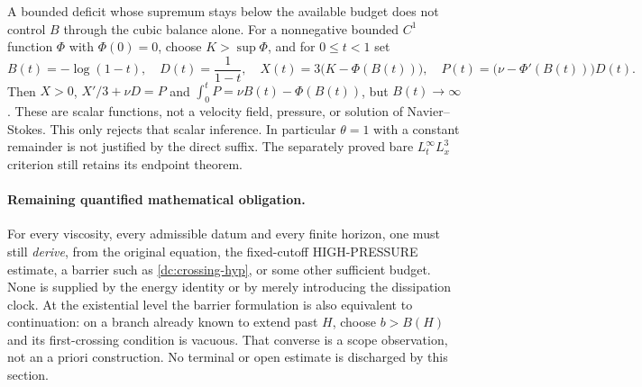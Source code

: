 \begin{remark}
\label{dc:scalar}
A bounded deficit whose supremum stays below the available budget does not
control $B$ through the cubic balance alone.  For a nonnegative bounded
$C^1$ function $\Phi$ with $\Phi(0)=0$, choose $K>\sup\Phi$, and for
$0\le t<1$ set
\[
 B(t)=-\log(1-t),\quad D(t)=\frac1{1-t},\quad
 X(t)=3\bigl(K-\Phi(B(t))\bigr),\quad
 P(t)=\bigl(\nu-\Phi'(B(t))\bigr)D(t).
\]
Then $X>0$, $X'/3+\nu D=P$ and
$\int_0^tP=\nu B(t)-\Phi(B(t))$, but $B(t)\to\infty$.
These are scalar functions, not a velocity field, pressure, or solution of
Navier--Stokes.  This only rejects that scalar inference.  In particular
$\theta=1$ with a constant remainder is not justified by the direct
suffix.  The separately proved bare $L^\infty_tL^3_x$ criterion still
retains its endpoint theorem.
\end{remark}

\paragraph{Remaining quantified mathematical obligation.}
For every viscosity, every admissible datum and every finite horizon, one
must still \emph{derive}, from the original equation, the fixed-cutoff
HIGH-PRESSURE estimate, a barrier such as \eqref{dc:crossing-hyp}, or some
other sufficient budget.  None is supplied by the energy identity or by
merely introducing the dissipation clock.  At the existential level the
barrier formulation is also equivalent to continuation: on a branch already
known to extend past $H$, choose $b>B(H)$ and its first-crossing condition
is vacuous.  That converse is a scope observation, not an a priori
construction.  No terminal or open estimate is discharged by this section.
